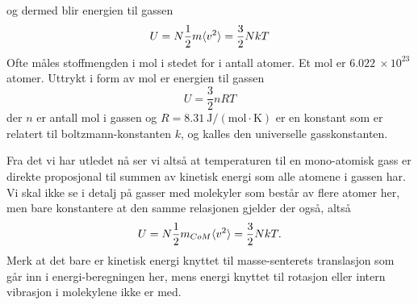og dermed blir energien til gassen 
\begin{equation}
\label{eq:kinetiskgassteori:Eideellgass}
	U = N\frac{1}{2} m\langle v^2 \rangle = \frac{3}{2}NkT
\end{equation}
Ofte måles stoffmengden i mol i stedet for i antall atomer. Et mol er $6.022~\times10^23$ atomer. Uttrykt i form av mol er energien til gassen 
\begin{equation}
\label{eq:kinetiskgassteori:EideellgassMol}
	U = \frac{3}{2}nRT
\end{equation}
der $n$ er antall mol i gassen og $R = 8.31~\mathrm{J/(mol\cdot K)}$ er en konstant som er relatert til boltzmann-konstanten $k$, og kalles den universelle gasskonstanten.	

Fra det vi har utledet nå ser vi altså at temperaturen til en mono-atomisk gass er direkte proposjonal til summen av kinetisk energi som alle atomene i gassen har. Vi skal ikke se i detalj på gasser med molekyler som består av flere atomer her, men bare konstantere at den samme relasjonen gjelder der også, altså
\begin{displaymath}
	U = N\frac{1}{2} m_{CoM}\langle v^2\rangle = \frac{3}{2}NkT.
\end{displaymath}
Merk at det bare er kinetisk energi knyttet til masse-senterets translasjon som går inn i energi-beregningen her, mens energi knyttet til rotasjon eller intern vibrasjon i molekylene ikke er med.


